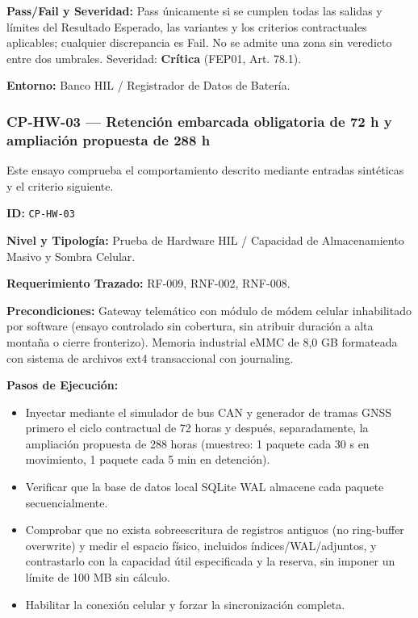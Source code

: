 \par\noindent\textbf{Pass/Fail y Severidad:} Pass únicamente si se cumplen todas las salidas y límites del Resultado Esperado, las variantes y los criterios contractuales aplicables; cualquier discrepancia es Fail. No se admite una zona sin veredicto entre dos umbrales. Severidad: \textbf{Crítica} (FEP01, Art. 78.1).\par
\par\noindent\textbf{Entorno:} Banco HIL / Registrador de Datos de Batería.\par






\subsubsection*{CP-HW-03 — Retención embarcada obligatoria de 72 h y ampliación propuesta de 288 h}\label{sec:9-cp-hw-03}

Este ensayo comprueba el comportamiento descrito mediante entradas sintéticas y el criterio siguiente.

\par\noindent\textbf{ID:} \texttt{CP-\allowbreak{}HW-\allowbreak{}03}\par
\par\noindent\textbf{Nivel y Tipología:} Prueba de Hardware HIL / Capacidad de Almacenamiento Masivo y Sombra Celular.\par
\par\noindent\textbf{Requerimiento Trazado:} RF-009, RNF-002, RNF-008.\par
\par\noindent\textbf{Precondiciones:} Gateway telemático con módulo de módem celular inhabilitado por software (ensayo controlado sin cobertura, sin atribuir duración a alta montaña o cierre fronterizo). Memoria industrial eMMC de 8,0 GB formateada con sistema de archivos ext4 transaccional con journaling.\par
\par\noindent\textbf{Pasos de Ejecución:}\par
\begin{itemize}
\item Inyectar mediante el simulador de bus CAN y generador de tramas GNSS primero el ciclo contractual de 72 horas y después, separadamente, la ampliación propuesta de 288 horas (muestreo: 1 paquete cada 30 s en movimiento, 1 paquete cada 5 min en detención).
\item Verificar que la base de datos local SQLite WAL almacene cada paquete secuencialmente.
\item Comprobar que no exista sobreescritura de registros antiguos (no ring-buffer overwrite) y medir el espacio físico, incluidos índices/WAL/adjuntos, y contrastarlo con la capacidad útil especificada y la reserva, sin imponer un límite de 100 MB sin cálculo.
\item Habilitar la conexión celular y forzar la sincronización completa.
\end{itemize}

